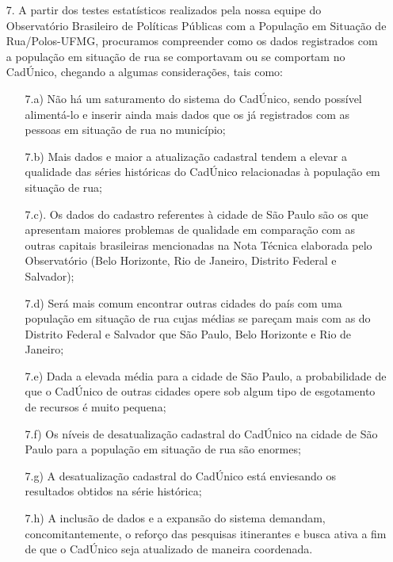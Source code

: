 \documentclass[14pt]{extarticle}
\begin{document}
\begin{enumerate}
  \item[7.] A partir dos testes estatísticos realizados pela nossa equipe do Observatório Brasileiro de Políticas Públicas com a População em Situação de Rua/Polos-UFMG, procuramos compreender como os dados registrados com a população em situação de rua se comportavam ou se comportam no CadÚnico, chegando a algumas considerações, tais como: 
  \begin{enumerate}
  \item[7.a)] Não há um saturamento do sistema do CadÚnico, sendo possível alimentá-lo e inserir ainda mais dados que os já registrados com as pessoas em situação de rua no município; 
  \item[7.b)] Mais dados e maior a atualização cadastral tendem a elevar a qualidade das séries históricas do CadÚnico relacionadas à população em situação de rua;
  \item[7.c).] Os dados do cadastro referentes à cidade de São Paulo são os que apresentam maiores problemas de qualidade em comparação com as outras capitais brasileiras mencionadas na Nota Técnica elaborada pelo Observatório (Belo Horizonte, Rio de Janeiro, Distrito Federal e Salvador); 
  \item[7.d)] Será mais comum encontrar outras cidades do país com uma população em situação de rua cujas médias se pareçam mais com as do Distrito Federal e Salvador que São Paulo, Belo Horizonte e Rio de Janeiro; 
  \item[7.e)] Dada a elevada média para a cidade de São Paulo, a probabilidade de que o CadÚnico de outras cidades opere sob algum tipo de esgotamento de recursos é muito pequena; 
  \item[7.f)]  Os níveis de desatualização cadastral do CadÚnico na cidade de São Paulo para a população em situação de rua são enormes; 
  \item[7.g)]  A desatualização cadastral do CadÚnico está enviesando os resultados obtidos na série histórica; 
  \item[7.h)] A inclusão de dados e a expansão do sistema demandam, concomitantemente, o reforço das pesquisas itinerantes e busca ativa a fim de que o CadÚnico seja atualizado de maneira coordenada. 
\end{enumerate}


\end{enumerate}
\end{document}
